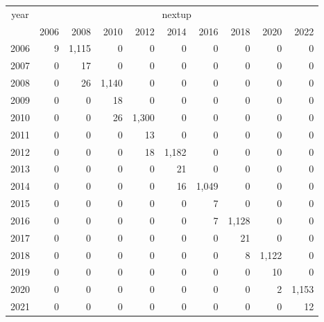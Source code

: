 \footnotesize\begin{tabular}[t]{lrrrrrrrrr}
\toprule
\multicolumn{1}{c}{year} & \multicolumn{9}{c}{nextup} \\
\cmidrule(l{3pt}r{3pt}){1-1} \cmidrule(l{3pt}r{3pt}){2-10}
  & 2006 & 2008 & 2010 & 2012 & 2014 & 2016 & 2018 & 2020 & 2022\\
\midrule
2006 & 9 & 1,115 & 0 & 0 & 0 & 0 & 0 & 0 & 0\\
2007 & 0 & 17 & 0 & 0 & 0 & 0 & 0 & 0 & 0\\
2008 & 0 & 26 & 1,140 & 0 & 0 & 0 & 0 & 0 & 0\\
2009 & 0 & 0 & 18 & 0 & 0 & 0 & 0 & 0 & 0\\
2010 & 0 & 0 & 26 & 1,300 & 0 & 0 & 0 & 0 & 0\\
2011 & 0 & 0 & 0 & 13 & 0 & 0 & 0 & 0 & 0\\
2012 & 0 & 0 & 0 & 18 & 1,182 & 0 & 0 & 0 & 0\\
2013 & 0 & 0 & 0 & 0 & 21 & 0 & 0 & 0 & 0\\
2014 & 0 & 0 & 0 & 0 & 16 & 1,049 & 0 & 0 & 0\\
2015 & 0 & 0 & 0 & 0 & 0 & 7 & 0 & 0 & 0\\
2016 & 0 & 0 & 0 & 0 & 0 & 7 & 1,128 & 0 & 0\\
2017 & 0 & 0 & 0 & 0 & 0 & 0 & 21 & 0 & 0\\
2018 & 0 & 0 & 0 & 0 & 0 & 0 & 8 & 1,122 & 0\\
2019 & 0 & 0 & 0 & 0 & 0 & 0 & 0 & 10 & 0\\
2020 & 0 & 0 & 0 & 0 & 0 & 0 & 0 & 2 & 1,153\\
2021 & 0 & 0 & 0 & 0 & 0 & 0 & 0 & 0 & 12\\
\bottomrule
\end{tabular}
